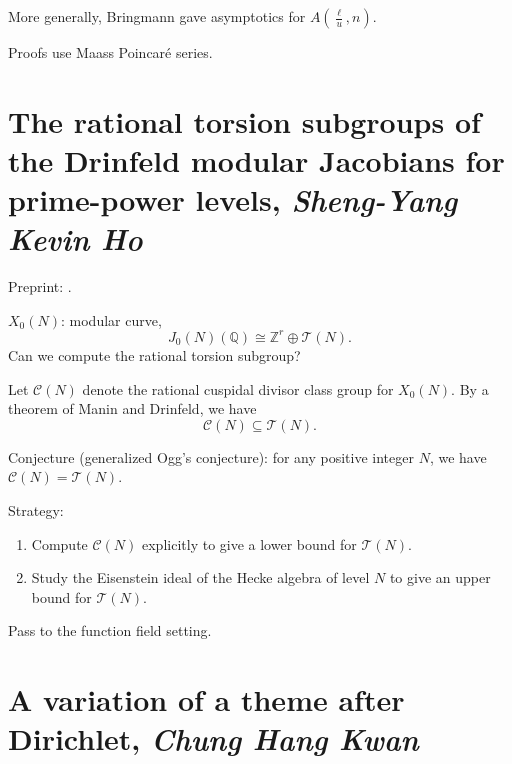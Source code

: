 \documentclass[reqno]{amsart} 
\begin{document}
More generally, Bringmann gave asymptotics for $A(\tfrac{\ell}{u}, n)$.

Proofs use Maass Poincar{\'e} series.

\section{The rational torsion subgroups of the Drinfeld modular Jacobians for prime-power levels, \textnormal{\emph{Sheng-Yang Kevin Ho}}}
Preprint: \cite{2024arXiv2404.00738}.


$X_0(N)$: modular curve,
\begin{equation*}
  J_0(N)(\mathbb{Q}) \cong \mathbb{Z}^r \oplus \mathcal{T}(N).
\end{equation*}
Can we compute the rational torsion subgroup?

Let $\mathcal{C}(N)$ denote the rational cuspidal divisor class group for $X_0(N)$.  By a theorem of Manin and Drinfeld, we have
\begin{equation*}
  \mathcal{C}(N) \subseteq \mathcal{T}(N).
\end{equation*}

Conjecture (generalized Ogg's conjecture): for any positive integer $N$, we have $\mathcal{C}(N) = \mathcal{T}(N)$.

Strategy:
\begin{enumerate}
\item Compute $\mathcal{C}(N)$ explicitly to give a lower bound for $\mathcal{T}(N)$.
\item Study the Eisenstein ideal of the Hecke algebra of level $N$ to give an upper bound for $\mathcal{T}(N)$.
\end{enumerate}

Pass to the function field setting.

\section{A variation of a theme after Dirichlet, \textnormal{\emph{Chung Hang Kwan}}}
\end{document}
